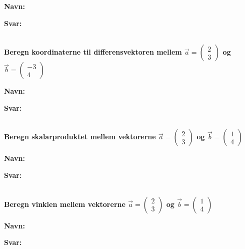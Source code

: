 \documentclass[a4paper, 12pt]{article}
\begin{document}
\textbf{Navn:}

\textbf{Svar:}

$\phantom{a}$\\
$\phantom{a}$\\
$\phantom{a}$\\

\textbf{Beregn koordinaterne til differensvektoren mellem \(\vec{a}= \begin{pmatrix} 2\\3 \end{pmatrix}\) og \(\vec{b}=\begin{pmatrix} -3 \\ 4 \end{pmatrix}\)}

\textbf{Navn:}

\textbf{Svar:}

$\phantom{a}$\\
$\phantom{a}$\\
$\phantom{a}$\\

\textbf{Beregn skalarproduktet mellem vektorerne \(\vec{a} = \begin{pmatrix} 2 \\ 3 \end{pmatrix}\) og \(\vec{b} = \begin{pmatrix} 1 \\ 4 \end{pmatrix}\)}

\textbf{Navn:}

\textbf{Svar:}

$\phantom{a}$\\
$\phantom{a}$\\
$\phantom{a}$\\

\textbf{Beregn vinklen mellem vektorerne \(\vec{a} = \begin{pmatrix} 2 \\ 3 \end{pmatrix}\) og \(\vec{b} = \begin{pmatrix} 1 \\ 4 \end{pmatrix}\)}

\textbf{Navn:}

\textbf{Svar:}

$\phantom{a}$\\
$\phantom{a}$\\
$\phantom{a}$\\
\end{document}
